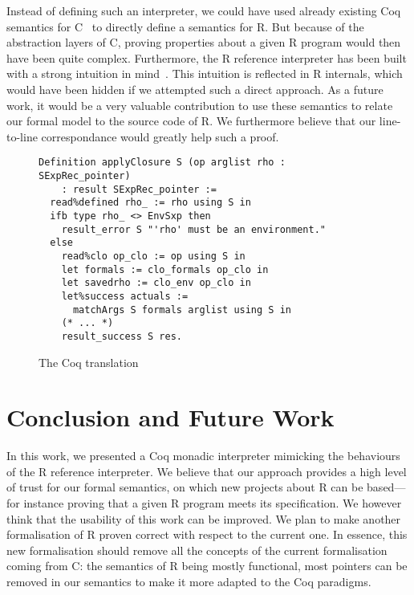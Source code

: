 \documentclass[9pt, sigplan, natbib=false, screen=true]{acmart}
\newcommand\Coq{Coq}
\newcommand\R{R}
\newcommand\Cn{C}
\begin{document}
Instead of defining such an interpreter,
we could have used already existing \Coq{} semantics
for \Cn{}~\parencite{formalin, Leroy-Compcert-CACM}
to directly define a semantics for \R{}.
But because of the abstraction layers of \Cn{},
proving properties about a given \R{} program
would then have been quite complex.
Furthermore, the \R{} reference interpreter has been built
with a strong intuition in mind~\parencite{ihaka1996r}.
This intuition is reflected in \R{} internals,
which would have been hidden if we attempted such a direct approach.
%
As a future work, it would be a very valuable contribution
to use these semantics to relate
our formal model to the source code of \R{}.
We furthermore believe that our line-to-line correspondance
would greatly help such a proof.

\begin{figure}
\begin{verbatim}
Definition applyClosure S (op arglist rho : SExpRec_pointer)
    : result SExpRec_pointer :=
  read%defined rho_ := rho using S in
  ifb type rho_ <> EnvSxp then
    result_error S "'rho' must be an environment."
  else
    read%clo op_clo := op using S in
    let formals := clo_formals op_clo in
    let savedrho := clo_env op_clo in
    let%success actuals :=
      matchArgs S formals arglist using S in
    (* ... *)
    result_success S res.
\end{verbatim}
    \caption{The \Coq{} translation}
    \label{fig:coq}
\end{figure}


\section{Conclusion and Future Work}
\label{sec:conclusion}

In this work, we presented a \Coq{} monadic interpreter
mimicking the behaviours of the \R{} reference interpreter.
We believe that our approach provides a high level of trust
for our formal semantics,
on which new projects about \R{} can be based---%
for instance
proving that a given \R{} program meets its specification.
We however think that the usability of this work can be improved.
We plan to make another formalisation
of \R{} proven correct with respect to the current one.
In essence, this new formalisation should
remove all the concepts of the current formalisation coming from \Cn{}:
the semantics of \R{} being mostly functional,
most pointers can be removed in our semantics
to make it more adapted to the \Coq{} paradigms.

%
%
%
%


\printbibliography
\end{document}
